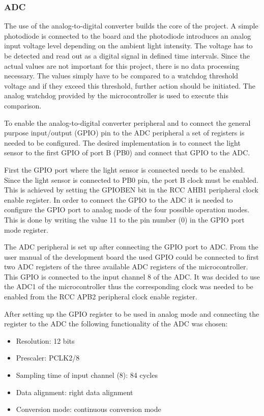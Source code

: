 \subsubsection{ADC}
The use of the analog-to-digital converter builds the core of the project. A simple photodiode is connected to the board and the photodiode introduces an analog input voltage level depending on the ambient light intensity. The voltage has to be detected and read out as a digital signal in defined time intervals. Since the actual values are not important for this project, there is no data processing necessary. The values simply have to be compared to a watchdog threshold voltage and if they exceed this threshold, further action should be initiated. The analog watchdog provided by the microcontroller is used to execute this comparison.\\
\par
To enable the analog-to-digital converter peripheral and to connect the general purpose input/output (GPIO) pin to the ADC peripheral a set of registers is needed to be configured. The desired implementation is to connect the light sensor to the first GPIO of port B (PB0) and connect that GPIO to the ADC.\\
\par
First the GPIO port where the light sensor is connected needs to be enabled. Since the light sensor is connected to PB0 pin, the port B clock must be enabled. This is achieved by setting the GPIOBEN bit in the RCC AHB1 peripheral clock enable register. In order to connect the GPIO to the ADC it is needed to configure the GPIO port to analog mode of the four possible operation modes. This is done by writing the value 11 to the pin number (0) in the GPIO port mode register.\\
\par
The ADC peripheral is set up after connecting the GPIO port to ADC. From the user manual of the development board \cite{UsrManual} the used GPIO could be connected to first two ADC registers of the three available ADC registers of the microcontroller. This GPIO is connected to the input channel 8 of the ADC. It was decided to use the ADC1 of the microcontroller thus the corresponding clock was needed to be enabled from the RCC APB2 peripheral clock enable register.\\
\par
After setting up the GPIO register to be used in analog mode and connecting the register to the ADC the following functionality of the ADC was chosen:
\begin{itemize}
  \item Resolution: 12 bits
  \item Prescaler: PCLK2/8
  \item Sampling time of input channel (8): 84 cycles
  \item Data alignment: right data alignment
  \item Conversion mode: continuous conversion mode
\end{itemize}
